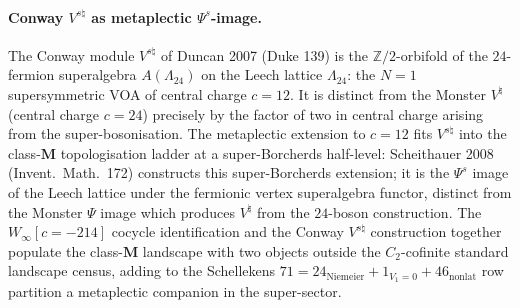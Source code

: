 \paragraph{Conway $V^{s\natural}$ as metaplectic $\Psi^s$-image.}
The Conway module $V^{s\natural}$ of Duncan 2007 (Duke 139) is the
$\mathbb Z/2$-orbifold of the $24$-fermion superalgebra
$A(\Lambda_{24})$ on the Leech lattice $\Lambda_{24}$: the $N = 1$
supersymmetric VOA of central charge $c = 12$. It is distinct from
the Monster $V^\natural$ (central charge $c = 24$) precisely by the
factor of two in central charge arising from the super-bosonisation.
The metaplectic extension to $c = 12$ fits $V^{s\natural}$ into the
class-$\mathbf{M}$ topologisation ladder at a super-Borcherds half-level:
Scheithauer 2008 (Invent.\ Math.\ 172) constructs this super-Borcherds
extension; it is the $\Psi^s$ image of the Leech lattice under the
fermionic vertex superalgebra functor, distinct from the Monster
$\Psi$ image which produces $V^\natural$ from the $24$-boson
construction. The $W_\infty[c = -214]$ cocycle identification and
the Conway $V^{s\natural}$ construction together populate the
class-$\mathbf{M}$ landscape with two objects outside the
$C_2$-cofinite standard landscape census, adding to the Schellekens
$71 = 24_{\mathrm{Niemeier}} + 1_{V_1=0} + 46_{\mathrm{nonlat}}$
row partition a metaplectic companion in the super-sector.

